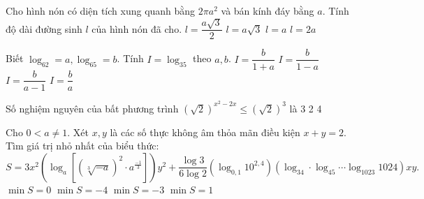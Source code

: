 \begin{ex}%
Cho hình nón có diện tích xung quanh bằng $2\pi a^2$ và bán kính đáy bằng $a$. Tính độ dài đường sinh $l$ của hình nón đã cho.
\choice
{$l=\dfrac{a\sqrt{3}}{2}$}
{$l=a\sqrt{3}$}
{$l=a$}
{\True $l=2a$}
\end{ex}
\begin{ex}%
Biết $\log _62=a,\log _65=b$. Tính $I=\log _35$ theo $a,b$.
\choice
{$I=\dfrac{b}{1+a}$}
{\True $I=\dfrac{b}{1-a}$}
{$I=\dfrac{b}{a-1}$}
{$I=\dfrac{b}{a}$}
\end{ex}
\begin{ex}%
Số nghiệm nguyên của bất phương trình ${\left(\sqrt{2}\right)}^{x^2-2x}\leqslant {\left(\sqrt{2}\right)}^3$ là
\choice
{3}
{2}
{}
{4}
\end{ex}
\begin{ex}%
Cho $0<a\ne 1$. Xét $x,y$ là các số thực không âm thỏa mãn điều kiện $x+y=2$. Tìm giá trị nhỏ nhất của biểu thức:\\
$S=3x^2\left(\log _a\left[{\left(\sqrt[3]{-a}\right)}^2\cdot a^{\tfrac{-1}{3}}\right]\right)y^2+\dfrac{\log 3}{6\log 2}\left(\log _{0{,}1}10^{2{,}4}\right)\left(\log _34\cdot\log _45\cdots \log_{1023}1024\right)xy.$
\choice
{$\min S=0$}
{$\min S=-4$}
{\True $\min S=-3$}
{$\min S=1$}
\end{ex}
